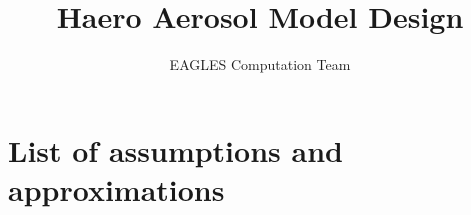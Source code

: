 \documentclass{book}
\theoremstyle{definition}
\theoremstyle{remark}
\begin{document}
\title{Haero Aerosol Model Design}
\author{EAGLES Computation Team}
\maketitle

\tableofcontents








\appendix




\chapter{List of assumptions and approximations}
\renewcommand{\listtheoremname}{}
\listoftheorems[ignoreall, show={assume,appx}, onlynamed]
\nocite{*}

\end{document}
